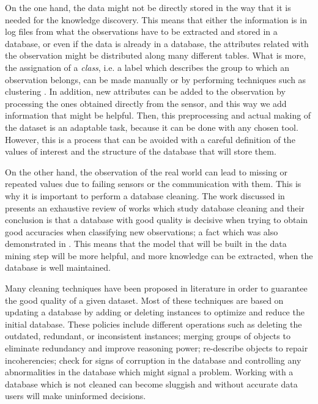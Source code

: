 On the one hand, the data might not be directly stored in the way that it is needed for the knowledge discovery. This means that either the information is in log files from what the observations have to be extracted and stored in a database, or even if the data is already in a database, the attributes related with the observation might be distributed along many different tables. What is more, the assignation of a \textit{class}, i.e. a label which describes the group to which an observation belongs, can be made manually or by performing techniques such as clustering \cite{witten2016data}. In addition, new attributes can be added to the observation by processing the ones obtained directly from the sensor, and this way we add information that might be helpful. Then, this preprocessing and actual making of the dataset is an adaptable task, because it can be done with any chosen tool. However, this is a process that can be avoided with a careful definition of the values of interest and the structure of the database that will store them.

On the other hand, the observation of the real world can lead to missing or repeated values due to failing sensors or the communication with them. This is why it is important to perform a database cleaning. The work discussed in \cite{wilson2001maintaining} presents an exhaustive review of works which study database cleaning and their conclusion is that a database with good quality is decisive when trying to obtain good accuracies when classifying new observations; a fact which was also demonstrated in \cite{zeineb2014thesis}. This means that the model that will be built in the data mining step will be more helpful, and more knowledge can be extracted, when the database is well maintained.

Many cleaning techniques have been proposed in literature \cite{wilson2001maintaining} in order to guarantee the good quality of
a given dataset. Most of these techniques are based on updating a database by adding or deleting instances to optimize and reduce the initial database. These policies include different operations such as deleting the outdated, redundant, or inconsistent instances; merging groups of objects to eliminate redundancy and improve reasoning power; re-describe objects to repair incoherencies; check for signs of corruption in the database and controlling any abnormalities in the database which might signal a problem. Working with a database which is not cleaned can become sluggish and without accurate data users will make uninformed decisions.

